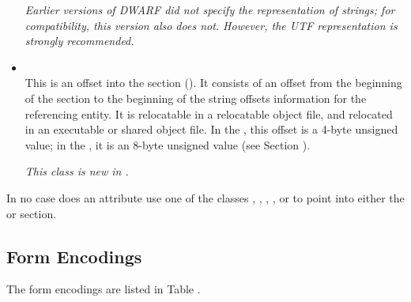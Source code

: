 \begin{itemize}
\textit{Earlier versions of DWARF did not specify the representation
of strings; for compatibility, this version also does
not. However, the UTF representation is strongly recommended.}

\item \CLASSstroffsetsptr \\
This is an offset into the \dotdebugstroffsets{} section 
(\DWFORMsecoffset). It consists of an offset from the beginning of the 
\dotdebugstroffsets{} section to the
beginning of the string offsets information for the
referencing entity. It is relocatable in
a relocatable object file, and relocated in an executable or
shared object file. In the \thirtytwobitdwarfformat, this offset
is a 4-byte unsigned value; in the \sixtyfourbitdwarfformat,
it is an 8-byte unsigned value (see Section
).

\textit{This class is new in \DWARFVersionV.}

\end{itemize}

In no case does an attribute use one of the classes 
\CLASSaddrptr,
\CLASSlineptr,
\CLASSloclistsptr, 
\CLASSmacptr, 
\CLASSrnglistsptr{} or 
\CLASSstroffsetsptr{}
to point into either the
\dotdebuginfo{} or \dotdebugstr{} section.

\subsection{Form Encodings}
\label{datarep:formencodings}
The form encodings are listed in 
Table .


